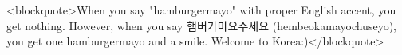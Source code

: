 \begin{post}
	\begin{content}
<blockquote>When you say "hamburgermayo" with proper English accent, you get nothing. However, when you say 햄버가마요주세요 (hembeokamayochuseyo), you get one hamburgermayo and a smile. Welcome to Korea:)</blockquote>
	\end{content}
\end{post}
